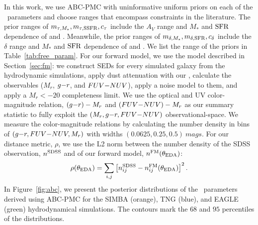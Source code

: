 In this work, we use ABC-PMC with uninformative uniform priors on each of
the \eda~parameters and choose ranges that encompass constraints in the
literature.
The prior ranges of $m_{\tau,M_*}, m_{\tau,{\rm SSFR}}, c_\tau$ include the $A_V$ range and $M_*$
and ${\rm SFR}$ dependence of \cite{narayanan2018} and \cite{salim2020}. 
Meanwhile, the prior ranges of $m_{\delta,M_*}, m_{\delta,{\rm SFR}}, c_\delta$ include the
$\delta$ range and $M_*$ and ${\rm SFR}$ dependence of \cite{leja2017} and
\cite{salim2018}. 
We list the range of the priors in Table~\ref{tab:free_param}. 
For our forward model, we use the model described in
Section~\ref{sec:fm}: we construct SEDs for every simulated galaxy from
the hydrodynamic simulations, apply dust attenuation with our
\eda, calculate the observables ($M_r$, $g{-}r$, and $FUV{-}NUV$), apply a noise
model to them, and apply a $M_r < -20$ completeness limit. 
We use the optical and UV color-magnitude relation, $(g{-}r)- M_r$ and
$(FUV{-}NUV)-M_r$ as our summary statistic to fully exploit the $(M_r, g{-}r,
FUV{-}NUV)$ observational-space. We measure the color-magnitude relations by
calculating the number density in bins of $(g{-}r, FUV{-}NUV, M_r)$ with widths
$(0.0625, 0.25, 0.5)~mags$. For our distance metric, $\rho$, we use the L2
norm between the number density of the SDSS observation, $n^{\rm SDSS}$ and
of our forward model, $n^{\rm FM}(\theta_{\rm EDA})$: 
\begin{equation} \label{eq:distance}
    \rho(\theta_{\rm \eda}) = \sum\limits_{i,j} \left[n_{ij}^{\rm SDSS} -
    n_{ij}^{\rm FM}(\theta_{\rm \eda}) \right]^2.
\end{equation}
In Figure~\ref{fig:abc}, we present the posterior distributions of the \eda~parameters
derived using ABC-PMC for the SIMBA (orange), TNG (blue), and EAGLE (green) hydrodynamical 
simulations. The contours mark the $68$ and $95$ percentiles of the distributions. 
